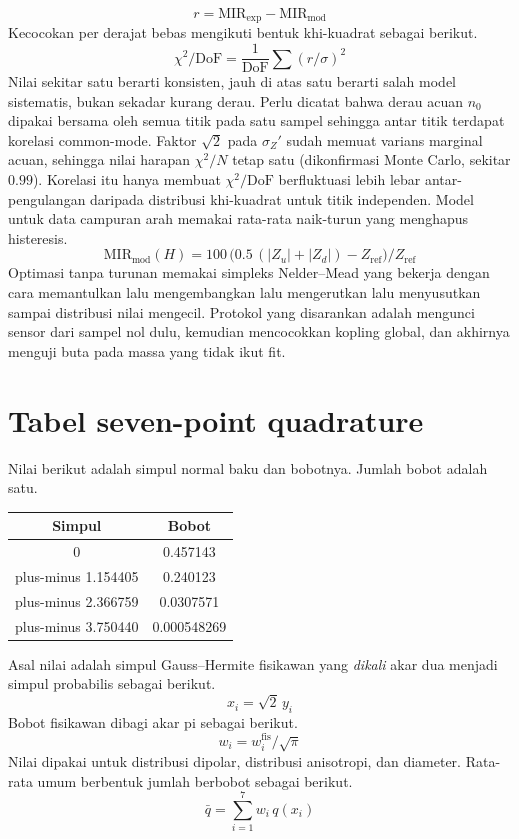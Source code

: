 \documentclass[a4paper,11pt]{article}
\begin{document}
\begin{equation*}
r = \mathrm{MIR}_{\mathrm{exp}}-\mathrm{MIR}_{\mathrm{mod}}
\end{equation*}
Kecocokan per derajat bebas mengikuti bentuk khi-kuadrat sebagai berikut.
\begin{equation*}
\chi^{2}/\mathrm{DoF} = \frac{1}{\mathrm{DoF}}\sum (r/\sigma)^{2}
\end{equation*}
Nilai sekitar satu berarti konsisten, jauh di atas satu berarti salah model
sistematis, bukan sekadar kurang derau.
Perlu dicatat bahwa derau acuan $n_{0}$ dipakai bersama oleh semua titik
pada satu sampel sehingga antar titik terdapat korelasi common-mode.
Faktor $\sqrt{2}$ pada $\sigma_{Z}'$ sudah memuat varians marginal acuan,
sehingga nilai harapan $\chi^{2}/N$ tetap satu (dikonfirmasi Monte Carlo,
sekitar $0.99$). Korelasi itu hanya membuat $\chi^{2}/\mathrm{DoF}$ berfluktuasi
lebih lebar antar-pengulangan daripada distribusi khi-kuadrat untuk titik
independen.
Model untuk data campuran arah memakai rata-rata naik-turun
yang menghapus histeresis.
\begin{equation*}
\mathrm{MIR}_{\mathrm{mod}}(H) =
100\,\bigl(0.5\,(|Z_{u}|+|Z_{d}|)-Z_{\mathrm{ref}}\bigr)/Z_{\mathrm{ref}}
\end{equation*}
Optimasi tanpa turunan memakai simpleks Nelder--Mead yang bekerja dengan
cara memantulkan lalu mengembangkan lalu mengerutkan lalu menyusutkan
sampai distribusi nilai mengecil.
Protokol yang disarankan adalah mengunci sensor dari sampel nol dulu,
kemudian mencocokkan kopling global, dan akhirnya menguji buta pada massa
yang tidak ikut fit.

\appendix
\section{Tabel seven-point quadrature}
Nilai berikut adalah simpul normal baku dan bobotnya.
Jumlah bobot adalah satu.
\begin{center}
\begin{tabular}{cc}
\toprule
Simpul & Bobot\\
\midrule
0 & 0.457143\\
plus-minus 1.154405 & 0.240123\\
plus-minus 2.366759 & 0.0307571\\
plus-minus 3.750440 & 0.000548269\\
\bottomrule
\end{tabular}
\end{center}
Asal nilai adalah simpul Gauss--Hermite fisikawan yang \emph{dikali}
akar dua menjadi simpul probabilis sebagai berikut.
\begin{equation*}
x_{i} = \sqrt{2}\,y_{i}
\end{equation*}
Bobot fisikawan dibagi akar pi sebagai berikut.
\begin{equation*}
w_{i} = w_{i}^{\mathrm{fis}}/\sqrt{\pi}
\end{equation*}
Nilai dipakai untuk distribusi dipolar, distribusi anisotropi, dan diameter.
Rata-rata umum berbentuk jumlah berbobot sebagai berikut.
\begin{equation*}
\bar q = \sum_{i=1}^{7} w_{i}\,q(x_{i})
\end{equation*}
\end{document}
